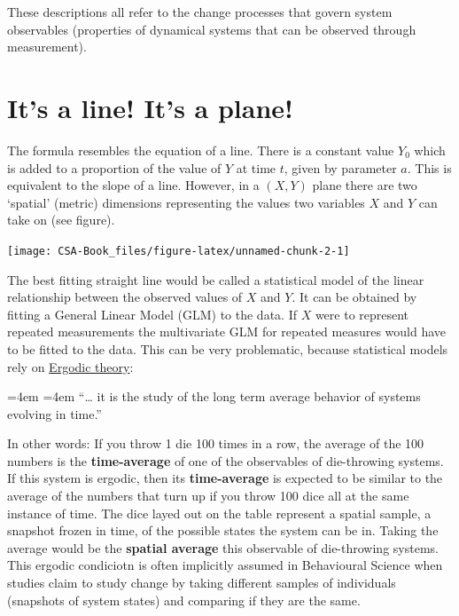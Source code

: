 \documentclass[12pt,]{book}
\renewenvironment{quote}{%
  \par \small \medskip \block
  \leftskip=4em \rightskip=4em%
  \noindent \ignorespaces}{%
  \par \medskip
  }
\let\stdsection\section
\renewcommand\section{\newpage\stdsection}
\let\BeginKnitrBlock\begin \let\EndKnitrBlock\end
\begin{document}
These descriptions all refer to the change processes that govern system observables (properties of dynamical systems that can be observed through measurement).

\hypertarget{its-a-line-its-a-plane}{%
\section{\texorpdfstring{\textbf{It's a line! It's a plane!}}{It's a line! It's a plane!}}\label{its-a-line-its-a-plane}}

The formula resembles the equation of a line. There is a constant value \(Y_{0}\) which is added to a proportion of the value of \(Y\) at time \(t\), given by parameter \(a\). This is equivalent to the slope of a line. However, in a \((X,Y)\) plane there are two `spatial' (metric) dimensions representing the values two variables \(X\) and \(Y\) can take on (see figure).

\begin{center}\texttt{[image: CSA-Book\_files/figure-latex/unnamed-chunk-2-1]} \end{center}

The best fitting straight line would be called a statistical model of the linear relationship between the observed values of \(X\) and \(Y\). It can be obtained by fitting a General Linear Model (GLM) to the data. If \(X\) were to represent repeated measurements the multivariate GLM for repeated measures would have to be fitted to the data. This can be very problematic, because statistical models rely on \href{https://en.wikipedia.org/wiki/Ergodic_theory}{Ergodic theory}:

\begin{quote}
``\ldots{} it is the study of the long term average behavior of systems evolving in time.''
\end{quote}

\BeginKnitrBlock{rmdkennen}
In other words: If you throw 1 die 100 times in a row, the average of the 100 numbers is the \textbf{time-average} of one of the observables of die-throwing systems. If this system is ergodic, then its \textbf{time-average} is expected to be similar to the average of the numbers that turn up if you throw 100 dice all at the same instance of time. The dice layed out on the table represent a spatial sample, a snapshot frozen in time, of the possible states the system can be in. Taking the average would be the \textbf{spatial average} this observable of die-throwing systems. This ergodic condiciotn is often implicitly assumed in Behavioural Science when studies claim to study change by taking different samples of individuals (snapshots of system states) and comparing if they are the same.
\EndKnitrBlock{rmdkennen}
\end{document}
